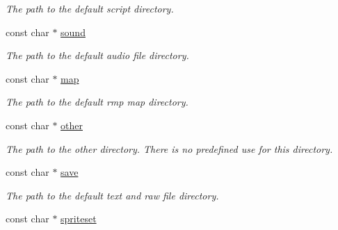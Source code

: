 \begin{DoxyCompactItemize}
\begin{DoxyCompactList}\small\item\em The path to the default script directory. \end{DoxyCompactList}\item 
\hypertarget{structTS__Directories_aaaa47d981eb0e4ffb9a5f9a688e952a3}{const char $\ast$ \hyperlink{structTS__Directories_aaaa47d981eb0e4ffb9a5f9a688e952a3}{sound}}\label{structTS__Directories_aaaa47d981eb0e4ffb9a5f9a688e952a3}

\begin{DoxyCompactList}\small\item\em The path to the default audio file directory. \end{DoxyCompactList}\item 
\hypertarget{structTS__Directories_a6889e8af317d47aa9e5fe46823a34b7d}{const char $\ast$ \hyperlink{structTS__Directories_a6889e8af317d47aa9e5fe46823a34b7d}{map}}\label{structTS__Directories_a6889e8af317d47aa9e5fe46823a34b7d}

\begin{DoxyCompactList}\small\item\em The path to the default rmp map directory. \end{DoxyCompactList}\item 
\hypertarget{structTS__Directories_a1874f142263fa3593af1f7b5fbcf96ac}{const char $\ast$ \hyperlink{structTS__Directories_a1874f142263fa3593af1f7b5fbcf96ac}{other}}\label{structTS__Directories_a1874f142263fa3593af1f7b5fbcf96ac}

\begin{DoxyCompactList}\small\item\em The path to the other directory. There is no predefined use for this directory. \end{DoxyCompactList}\item 
\hypertarget{structTS__Directories_a2d3c1857d5dc9f7dde071588198135df}{const char $\ast$ \hyperlink{structTS__Directories_a2d3c1857d5dc9f7dde071588198135df}{save}}\label{structTS__Directories_a2d3c1857d5dc9f7dde071588198135df}

\begin{DoxyCompactList}\small\item\em The path to the default text and raw file directory. \end{DoxyCompactList}\item 
\hypertarget{structTS__Directories_aec661d2cb390824b0479e844c0dbe4cd}{const char $\ast$ \hyperlink{structTS__Directories_aec661d2cb390824b0479e844c0dbe4cd}{spriteset}}\label{structTS__Directories_aec661d2cb390824b0479e844c0dbe4cd}


\end{DoxyCompactItemize}
